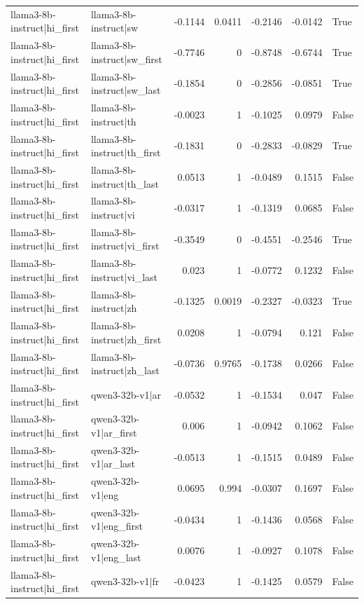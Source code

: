 \begin{table}
\begin{tabular}{l l r r r r l}
llama3-8b-instruct|hi_first & llama3-8b-instruct|sw & -0.1144 & 0.0411 & -0.2146 & -0.0142 & True \\
llama3-8b-instruct|hi_first & llama3-8b-instruct|sw_first & -0.7746 & 0 & -0.8748 & -0.6744 & True \\
llama3-8b-instruct|hi_first & llama3-8b-instruct|sw_last & -0.1854 & 0 & -0.2856 & -0.0851 & True \\
llama3-8b-instruct|hi_first & llama3-8b-instruct|th & -0.0023 & 1 & -0.1025 & 0.0979 & False \\
llama3-8b-instruct|hi_first & llama3-8b-instruct|th_first & -0.1831 & 0 & -0.2833 & -0.0829 & True \\
llama3-8b-instruct|hi_first & llama3-8b-instruct|th_last & 0.0513 & 1 & -0.0489 & 0.1515 & False \\
llama3-8b-instruct|hi_first & llama3-8b-instruct|vi & -0.0317 & 1 & -0.1319 & 0.0685 & False \\
llama3-8b-instruct|hi_first & llama3-8b-instruct|vi_first & -0.3549 & 0 & -0.4551 & -0.2546 & True \\
llama3-8b-instruct|hi_first & llama3-8b-instruct|vi_last & 0.023 & 1 & -0.0772 & 0.1232 & False \\
llama3-8b-instruct|hi_first & llama3-8b-instruct|zh & -0.1325 & 0.0019 & -0.2327 & -0.0323 & True \\
llama3-8b-instruct|hi_first & llama3-8b-instruct|zh_first & 0.0208 & 1 & -0.0794 & 0.121 & False \\
llama3-8b-instruct|hi_first & llama3-8b-instruct|zh_last & -0.0736 & 0.9765 & -0.1738 & 0.0266 & False \\
llama3-8b-instruct|hi_first & qwen3-32b-v1|ar & -0.0532 & 1 & -0.1534 & 0.047 & False \\
llama3-8b-instruct|hi_first & qwen3-32b-v1|ar_first & 0.006 & 1 & -0.0942 & 0.1062 & False \\
llama3-8b-instruct|hi_first & qwen3-32b-v1|ar_last & -0.0513 & 1 & -0.1515 & 0.0489 & False \\
llama3-8b-instruct|hi_first & qwen3-32b-v1|eng & 0.0695 & 0.994 & -0.0307 & 0.1697 & False \\
llama3-8b-instruct|hi_first & qwen3-32b-v1|eng_first & -0.0434 & 1 & -0.1436 & 0.0568 & False \\
llama3-8b-instruct|hi_first & qwen3-32b-v1|eng_last & 0.0076 & 1 & -0.0927 & 0.1078 & False \\
llama3-8b-instruct|hi_first & qwen3-32b-v1|fr & -0.0423 & 1 & -0.1425 & 0.0579 & False \\

\end{tabular}
\end{table}
